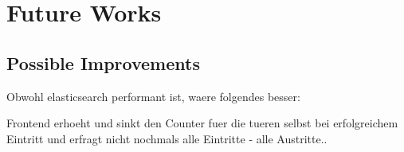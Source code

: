 \chapter{Future Works}

\section{Possible Improvements}

Obwohl elasticsearch performant ist, waere folgendes besser:

Frontend erhoeht und sinkt den Counter fuer die tueren selbst bei erfolgreichem Eintritt und erfragt nicht nochmals alle Eintritte - alle Austritte..

